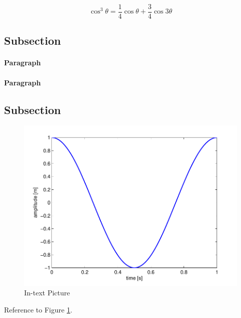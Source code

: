\documentclass[fleqn,10pt,lineno]{wlpeerj} %
\begin{document}
\lipsum[4] %

\begin{equation}
\cos^3 \theta =\frac{1}{4}\cos\theta+\frac{3}{4}\cos 3\theta
\label{eq:refname2}
\end{equation}

\lipsum[5] %

\subsection*{Subsection}

\lipsum[6] %

\paragraph{Paragraph} \lipsum[7] %
\paragraph{Paragraph} \lipsum[8] %

\subsection*{Subsection}

\lipsum[9] %

\begin{figure}[ht]\centering
\includegraphics[width=\linewidth]{results}
\caption{In-text Picture}
\label{fig:results}
\end{figure}

Reference to Figure \ref{fig:results}.
\end{document}
